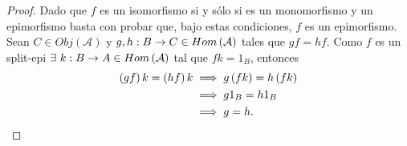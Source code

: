 \documentclass{article}
\begin{document}
	\begin{proof}
		Dado que $f$ es un isomorfismo si y sólo si es un monomorfismo y un epimorfismo basta con probar que, bajo estas condiciones, $f$ es un epimorfismo. Sean $C\in Obj(\mathcal{A})$ y $g,h:B\to C\in Hom\left(\mathcal{A}\right)$ tales que $gf=hf$. Como $f$ es un split-epi $\exists\ k:B\to A\in Hom\left(\mathcal{A}\right)$ tal que $fk=1_B$, entonces
		\begin{align*}
			\left(gf\right)k=\left(hf\right)k&\implies g\left(fk\right)=h\left(fk\right)\\
			&\implies g1_B=h1_B\\
			&\implies g=h.
		\end{align*}
	\end{proof}
\end{document}
